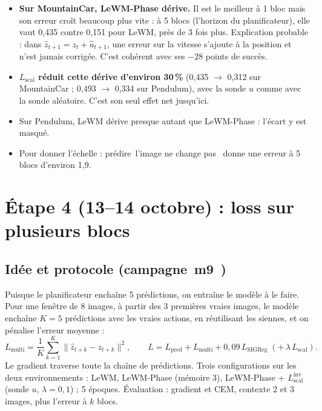 \documentclass[11pt,a4paper]{article}
\newcommand{\og}{\guillemotleft\,\ignorespaces}
\newcommand{\fg}{\unskip\,\guillemotright}
\newcommand{\Lscal}{L_{\mathrm{scal}}}
\newcommand{\Lpred}{L_{\mathrm{pred}}}
\begin{document}
\begin{itemize}
  \item \textbf{Sur MountainCar, LeWM-Phase dérive.} Il est le meilleur à 1 bloc mais son erreur
  croît beaucoup plus vite : à 5 blocs (l'horizon du planificateur), elle vaut 0,435 contre
  0,151 pour LeWM, près de 3 fois plus. Explication probable : dans
  $\hat z_{t+1} = z_t + \hat u_{t+1}$, une erreur sur la vitesse s'ajoute à la position et n'est
  jamais corrigée. C'est cohérent avec ses $-28$ points de succès.
  \item \textbf{$\Lscal$ réduit cette dérive d'environ 30\,\%} (0,435 $\to$ 0,312 sur MountainCar ;
  0,493 $\to$ 0,334 sur Pendulum), avec la sonde $u$ comme avec la sonde aléatoire. C'est son
  seul effet net jusqu'ici.
  \item Sur Pendulum, LeWM dérive presque autant que LeWM-Phase : l'écart y est masqué.
  \item Pour donner l'échelle : prédire \og l'image ne change pas \fg{} donne une erreur à
  5 blocs d'environ 1,9.
\end{itemize}

\section{Étape 4 (13--14 octobre) : loss sur plusieurs blocs}
\label{sec:m9}

\subsection{Idée et protocole (campagne \og m9 \fg{})}

Puisque le planificateur enchaîne 5 prédictions, on entraîne le modèle à le faire. Pour une
fenêtre de 8 images, à partir des 3 premières vraies images, le modèle enchaîne $K = 5$
prédictions avec les vraies actions, en réutilisant les siennes, et on pénalise l'erreur
moyenne :
\[
  L_{\mathrm{multi}} = \frac{1}{K}\sum_{k=1}^{K} \bigl\|\hat z_{t+k} - z_{t+k}\bigr\|^2,
  \qquad L = \Lpred + L_{\mathrm{multi}} + 0{,}09\, L_{\mathrm{SIGReg}} \;(+\,\lambda\,\Lscal).
\]
Le gradient traverse toute la chaîne de prédictions. Trois configurations sur les deux
environnements : LeWM, LeWM-Phase (mémoire 3), LeWM-Phase + $\Lscal^{\mathrm{inv}}$ (sonde $u$,
$\lambda = 0{,}1$) ; 5 époques. Évaluation : gradient et CEM, contexte 2 et 3 images, plus
l'erreur à $k$ blocs.
\end{document}
